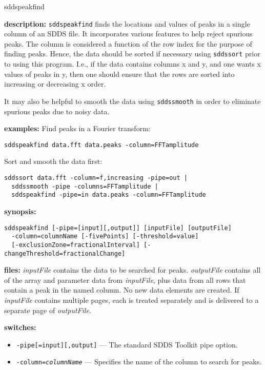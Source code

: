 \begin{sddsprog}{sddspeakfind}
  \item \textbf{description:}
  \verb|sddspeakfind| finds the locations and values of peaks in a single column of an SDDS file.  It incorporates
  various features to help reject spurious peaks.  The column is considered a function of the row index for the
  purpose of finding peaks.  Hence, the data should be sorted if necessary using \verb|sddssort| prior to using this
  program.  I.e., if the data contains columns x and y, and one wants x values of peaks in y, then one should
  ensure that the rows are sorted into increasing or decreasing x order.

  It may also be helpful to smooth the data using \verb|sddssmooth| in order to eliminate spurious peaks due to
  noisy data.
  \item \textbf{examples:}
    Find peaks in a Fourier transform:
    \begin{verbatim}
sddspeakfind data.fft data.peaks -column=FFTamplitude
    \end{verbatim}
    Sort and smooth the data first:
    \begin{verbatim}
sddssort data.fft -column=f,increasing -pipe=out |
  sddssmooth -pipe -columns=FFTamplitude |
  sddspeakfind -pipe=in data.peaks -column=FFTamplitude
    \end{verbatim}
  \item \textbf{synopsis:}
    \begin{verbatim}
sddspeakfind [-pipe=[input][,output]] [inputFile] [outputFile]
  -column=columnName [-fivePoints] [-threshold=value]
  [-exclusionZone=fractionalInterval] [-changeThreshold=fractionalChange]
    \end{verbatim}
  \item \textbf{files:}
  \emph{inputFile} contains the data to be searched for peaks.  \emph{outputFile} contains all of the array and
  parameter data from \emph{inputFile}, plus data from all rows that contain a peak in the named column.  No new
  data elements are created.  If \emph{inputFile} contains multiple pages, each is treated separately and is
  delivered to a separate page of \emph{outputFile}.
  \item \textbf{switches:}
    \begin{itemize}
      \item \verb|-pipe[=input][,output]| --- The standard SDDS Toolkit pipe option.
      \item {\tt -column={\em columnName}} --- Specifies the name of the column to search for peaks.

\end{itemize}
\end{sddsprog}
